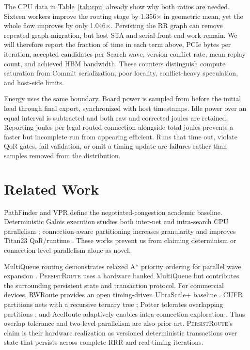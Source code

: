 \documentclass[sigconf,anonymous,review]{acmart}
\newcommand{\system}{\textsc{PersistRoute}}
\begin{document}
The CPU data in Table~\ref{tab:cpu} already show why both ratios are
needed. Sixteen workers improve the routing stage by 1.356$\times$ in geometric
mean, yet the whole flow improves by only 1.046$\times$. Persisting the RR graph
can remove repeated graph migration, but host STA and serial front-end work
remain. We will therefore report the fraction of time in each term above, PCIe
bytes per iteration, accepted candidates per Search wave, version-conflict
rate, mean replay count, and achieved HBM bandwidth. These counters distinguish
compute saturation from Commit serialization, poor locality, conflict-heavy
speculation, and host-side limits.

Energy uses the same boundary. Board power is sampled from before the initial
load through final export, synchronized with host timestamps. Idle power over
an equal interval is subtracted and both raw and corrected joules are retained.
Reporting joules per legal routed connection alongside total joules prevents a
faster but incomplete run from appearing efficient. Runs that time out, violate
QoR gates, fail validation, or omit a timing update are failures rather than
samples removed from the distribution.

\section{Related Work}

PathFinder \cite{mcmurchie1995pathfinder} and VPR
\cite{betz1997vpr,vtr8} define the negotiated-congestion academic baseline.
Deterministic Galois execution studies both inter-net and intra-search CPU
parallelism \cite{moctar2018galois}; connection-aware partitioning increases
granularity and improves Titan23 QoR/runtime \cite{zhou2020connection}. These
works prevent us from claiming determinism or connection-level parallelism
alone as novel.

MultiQueue routing demonstrates relaxed A* priority ordering for parallel
wave expansion \cite{singer2024multiqueue}. \system{} uses a hardware banked
MultiQueue but contributes the surrounding persistent state and transaction
protocol. For commercial devices, RWRoute provides an open timing-driven
UltraScale+ baseline \cite{zhou2021rwroute}. CUFR partitions nets with a
recursive ternary tree \cite{zang2024cufr}; Potter tolerates overlapping
partitions \cite{zang2024potter}; and AceRoute adaptively enables
intra-connection exploration \cite{wei2024aceroute}. Thus overlap tolerance
and two-level parallelism are also prior art. \system{}'s claim is their
hardware realization as versioned deterministic transactions over state that
persists across complete RRR and real-timing iterations.
\end{document}
